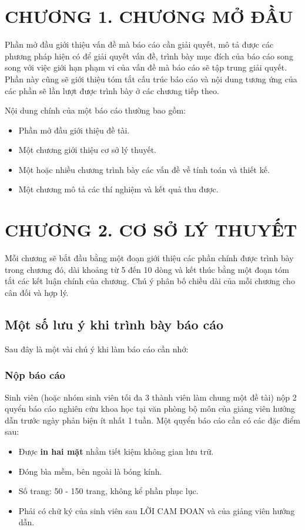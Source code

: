 \documentclass{article} %
\begin{document}
\section*{CHƯƠNG 1. CHƯƠNG MỞ ĐẦU}
Phần mở đầu giới thiệu vấn đề mà báo cáo cần giải quyết, mô tả được các phương pháp hiện có để giải quyết vấn đề,
trình bày mục đích của báo cáo song song với việc giới hạn phạm vi của vấn đề mà báo cáo sẽ tập trung giải quyết.
Phần này cũng sẽ giới thiệu tóm tắt cấu trúc báo cáo và nội dung tương ứng của các phần sẽ lần lượt được trình bày
ở các chương tiếp theo.

Nội dung chính của một báo cáo thường bao gồm: 
\begin{itemize}
    \item Phần mở đầu giới thiệu đề tài.
    \item Một chương giới thiệu cơ sở lý thuyết.
    \item Một hoặc nhiều chương trình bày các vấn đề về tính toán và thiết kế.
    \item Một chương mô tả các thí nghiệm và kết quả thu được.
\end{itemize}
\newpage

\section*{CHƯƠNG 2. CƠ SỞ LÝ THUYẾT}
\setcounter{section}{2}
\setcounter{subsection}{0}
Mỗi chương sẽ bắt đầu bằng một đoạn giới thiệu các phần chính được trình bày  trong chương đó, dài khoảng từ 5 đến 10
dòng và kết thúc bằng một đoạn tóm tắt các kết luận chính của chương. Chú ý phân bố chiều dài của mỗi chương cho cân
đối và hợp lý.
\subsection{Một số lưu ý khi trình bày báo cáo}
Sau đây là một vài chú ý khi làm báo cáo cần nhớ:
\subsubsection{Nộp báo cáo}
\vspace{-35pt}
Sinh viên (hoặc nhóm sinh viên tối đa 3 thành viên làm chung một đề tài) nộp 2 quyển báo cáo nghiên cứu khoa học tại
văn phòng bộ môn của giảng viên hướng dẫn trước ngày phản biện ít nhất 1 tuần. Một quyển báo cáo cần có các đặc điểm
sau:
\begin{itemize}
    \item Được \textbf{in hai mặt} nhằm tiết kiệm không gian lưu trữ.
    \item Đóng bìa mềm, bên ngoài là bóng kính.
    \item Số trang: 50 - 150 trang, không kể phần phục lục.
    \item Phải có chữ ký của sinh viên sau LỜI CAM ĐOAN và của giảng viên hướng dẫn.
\end{itemize}
\end{document}
